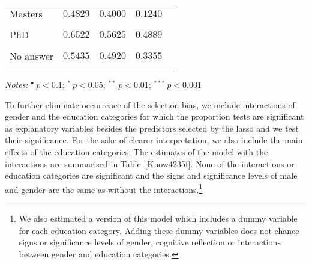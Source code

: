 \documentclass[a4paper,12pt]{article}
\begin{document}
{\begin{threeparttable}
\begin{small}
\begin{tabular}{l|cccl}
\\
  \vspace{-0.2cm}Masters&$0.4829$&$0.4000$&$0.1240$&\\
  \\
  \vspace{-0.2cm}PhD&$0.6522$&$0.5625$&$0.4889$&\\
\\
  \vspace{-0.2cm}No answer&$0.5435$&$0.4920$&$0.3355$&\\
\\
\hline
\end{tabular} 
\end{small}
 \begin{tablenotes}
  \begin{footnotesize}
\item[~]\textit{Notes:} \hspace{0.24cm}$^{\bullet}~p<0.1$; $^{*}~p<0.05$; $^{**}~p<0.01$; $^{***}~p<0.001$
\singlespacing
  \end{footnotesize}
\end{tablenotes}
  \end{threeparttable} 
\par}
\linespread{1}
\newpage



\vspace{1cm}


To further eliminate occurrence of the selection bias, we include interactions of gender and the education categories for which the proportion tests are significant as explanatory variables besides the predictors selected by the lasso and we test their significance. For the sake of clearer interpretation, we also include the main effects of the education categories. The estimates of the model with the interactions are summarised in Table~\ref{Know4235f}. None of the interactions or education categories are significant and the signs and significance levels of male and gender are the same as without the interactions.\footnote{We also estimated a version of this model which includes a dummy variable for each education category. Adding these dummy variables does not chance signs or significance levels of gender, cognitive reflection or interactions between gender and education categories.}
\end{document}
